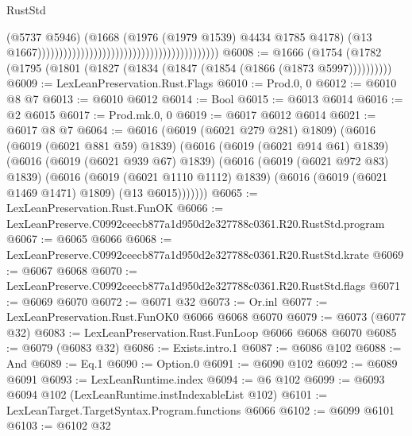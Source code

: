 \begin{lexlean}{RustStd}
\begin{coremodule}
                                                                                    (@5737 @5946)
                                                                                    (@1668
                                                                                      (@1976
                                                                                        (@1979
                                                                                          @1539)
                                                                                        @4434
                                                                                        @1785
                                                                                        @4178)
                                                                                      (@13
                                                                                        @1667))))))))))))))))))))))))))))))))))))))))))
@6008 := @1666 (@1754 (@1782 (@1795 (@1801 (@1827 (@1834 (@1847 (@1854 (@1866 (@1873 @5997))))))))))
@6009 := LexLeanPreservation.Rust.Flags
@6010 := Prod.{0, 0}
@6012 := @6010 @8 @7
@6013 := @6010 @6012
@6014 := Bool
@6015 := @6013 @6014
@6016 := @2 @6015
@6017 := Prod.mk.{0, 0}
@6019 := @6017 @6012 @6014
@6021 := @6017 @8 @7
@6064 := @6016
    (@6019 (@6021 @279 @281) @1809)
    (@6016
      (@6019 (@6021 @881 @59) @1839)
      (@6016
        (@6019 (@6021 @914 @61) @1839)
        (@6016
          (@6019 (@6021 @939 @67) @1839)
          (@6016
            (@6019 (@6021 @972 @83) @1839)
            (@6016
              (@6019 (@6021 @1110 @1112) @1839)
              (@6016 (@6019 (@6021 @1469 @1471) @1809) (@13 @6015)))))))
@6065 := LexLeanPreservation.Rust.FunOK
@6066 := LexLeanPreserve.C0992ceecb877a1d950d2e327788c0361.R20.RustStd.program
@6067 := @6065 @6066
@6068 := LexLeanPreserve.C0992ceecb877a1d950d2e327788c0361.R20.RustStd.krate
@6069 := @6067 @6068
@6070 := LexLeanPreserve.C0992ceecb877a1d950d2e327788c0361.R20.RustStd.flags
@6071 := @6069 @6070
@6072 := @6071 @32
@6073 := Or.inl
@6077 := LexLeanPreservation.Rust.FunOK0 @6066 @6068 @6070
@6079 := @6073 (@6077 @32)
@6083 := LexLeanPreservation.Rust.FunLoop @6066 @6068 @6070
@6085 := @6079 (@6083 @32)
@6086 := Exists.intro.{1}
@6087 := @6086 @102
@6088 := And
@6089 := Eq.{1}
@6090 := Option.{0}
@6091 := @6090 @102
@6092 := @6089 @6091
@6093 := LexLeanRuntime.index
@6094 := @6 @102
@6099 := @6093 @6094 @102 (LexLeanRuntime.instIndexableList @102)
@6101 := LexLeanTarget.TargetSyntax.Program.functions @6066
@6102 := @6099 @6101
@6103 := @6102 @32

\end{coremodule}
\end{lexlean}
